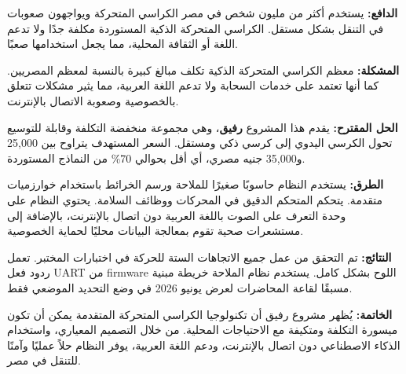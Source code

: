 \documentclass[12pt,a4paper]{report}
\begin{document}
\begin{Arabic}
\textbf{الدافع:}
يستخدم أكثر من مليون شخص في مصر الكراسي المتحركة ويواجهون صعوبات في التنقل بشكل مستقل. الكراسي المتحركة الذكية المستوردة مكلفة جدًا ولا تدعم اللغة أو الثقافة المحلية، مما يجعل استخدامها صعبًا.
\end{Arabic}
\vspace{0.3cm}

\begin{Arabic}
\textbf{المشكلة:}
معظم الكراسي المتحركة الذكية تكلف مبالغ كبيرة بالنسبة لمعظم المصريين. كما أنها تعتمد على خدمات السحابة ولا تدعم اللغة العربية، مما يثير مشكلات تتعلق بالخصوصية وصعوبة الاتصال بالإنترنت.
\end{Arabic}
\vspace{0.3cm}

\begin{Arabic}
\textbf{الحل المقترح:}
يقدم هذا المشروع \textbf{رفيق}، وهي مجموعة منخفضة التكلفة وقابلة للتوسيع تحول الكرسي اليدوي إلى كرسي ذكي ومستقل. السعر المستهدف يتراوح بين 25,000 و35,000 جنيه مصري، أي أقل بحوالي 70\% من النماذج المستوردة.
\end{Arabic}
\vspace{0.3cm}

\begin{Arabic}
\textbf{الطرق:}
يستخدم النظام حاسوبًا صغيرًا للملاحة ورسم الخرائط باستخدام خوارزميات متقدمة. يتحكم المتحكم الدقيق في المحركات ووظائف السلامة. يحتوي النظام على وحدة التعرف على الصوت باللغة العربية دون اتصال بالإنترنت، بالإضافة إلى مستشعرات صحية تقوم بمعالجة البيانات محليًا لحماية الخصوصية.
\end{Arabic}
\vspace{0.3cm}

\begin{Arabic}
\textbf{النتائج:}
تم التحقق من عمل جميع الاتجاهات الستة للحركة في اختبارات المختبر. تعمل ردود فعل UART من firmware اللوح بشكل كامل. يستخدم نظام الملاحة خريطة مبنية مسبقًا لقاعة المحاضرات لعرض يونيو 2026 في وضع التحديد الموضعي فقط.
\end{Arabic}
\vspace{0.3cm}

\begin{Arabic}
\textbf{الخاتمة:}
يُظهر مشروع رفيق أن تكنولوجيا الكراسي المتحركة المتقدمة يمكن أن تكون ميسورة التكلفة ومتكيفة مع الاحتياجات المحلية. من خلال التصميم المعياري، واستخدام الذكاء الاصطناعي دون اتصال بالإنترنت، ودعم اللغة العربية، يوفر النظام حلاً عمليًا وآمنًا للتنقل في مصر.
\end{Arabic}
\end{document}
